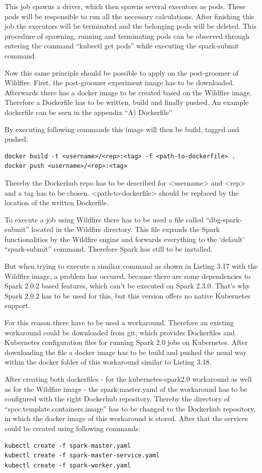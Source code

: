 This job spawns a driver, which then spawns several executors as pods. These pods will be responsible to run all the necessary calculations. After finishing this job the executors will be terminated and the belonging pods will be deleted. This procedure of spawning, running and terminating pods can be observed through entering the command ``kubectl get pods'' while executing the spark-submit command.

Now this same principle should be possible to apply on the post-groomer of Wildfire. First, the post-groomer experiment image has to be downloaded. Afterwards there has a docker image to be created based on the Wildfire image. Therefore a Dockerfile has to be written, build and finally pushed. An example dockerfile can be seen in the appendix ``A) Dockerfile''

By executing following commands this image will then be build, tagged and pushed:
\begin{lstlisting}[caption={Build Wildfire docker image},captionpos=b]
docker build -t <username>/<rep>:<tag> -f <path-to-dockerfile> .
docker push <username>/<rep>:<tag>
\end{lstlisting}
Thereby the Dockerhub repo has to be described for <username> and <rep> and a tag has to be chosen. <path-to-dockerfile> should be replaced by the location of the written Dockerfile.

To execute a job using Wildfire there has to be used a file called ``dbg-spark-submit'' located in the Wildfire directory. This file expands the Spark functionalities by the Wildfire engine and forwards everything to the `default' ``spark-submit'' command. Therefore Spark has still to be installed.

But when trying to execute a similiar command as shown in Listing 3.17 with the Wildfire image, a problem has occured, because there are some dependencies to Spark 2.0.2 based features, which can't be executed on Spark 2.3.0. That's why Spark 2.0.2 has to be used for this, but this version offers no native Kubernetes support.

For this reason there have to be used a workaround. Therefore an existing workaround could be downloaded from git, which provides Dockerfiles and Kubernetes configuration files for running Spark 2.0 jobs on Kubernetes. After downloading the file a docker image has to be build and pushed the usual way within the docker folder of this workaround similar to Listing 3.18.

After creating both dockerfiles - for the kubernetes-spark2.0 workaround as well as for the Wildfire image - the spark-master.yaml of the workaround has to be configured with the right Dockerhub repository. Thereby the directory of ``spec.template.containers.image'' has to be changed to the Dockerhub repository, in which the docker image of this workaround is stored. After that the services could be created using following commands:
\begin{lstlisting}[caption={Create Spark 2.0 services on Kubernetes},captionpos=b]
kubectl create -f spark-master.yaml
kubectl create -f spark-master-service.yaml
kubectl create -f spark-worker.yaml
\end{lstlisting}

